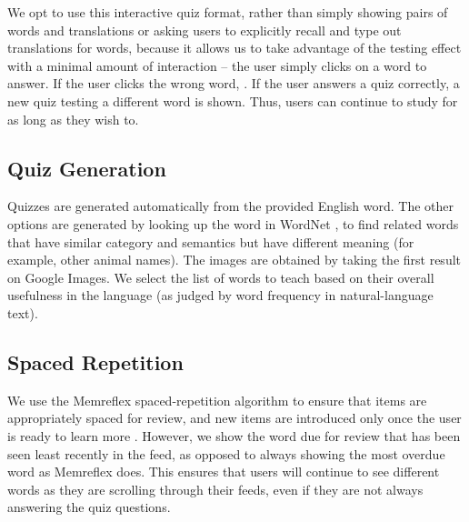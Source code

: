\documentclass{chi-ext}
\begin{document}

We opt to use this interactive quiz format, rather than simply showing pairs of words and translations or asking users to explicitly recall and type out translations for words, because it allows us to take advantage of the testing effect with a minimal amount of interaction -- the user simply clicks on a word to answer. If the user clicks the wrong word, . If the user answers a quiz correctly, a new quiz testing a different word is shown. Thus, users can continue to study for as long as they wish to.

\subsection{Quiz Generation}

Quizzes are generated automatically from the provided English word. The other options are generated by looking up the word in WordNet \cite{wordnet}, to find related words that have similar category and semantics but have different meaning (for example, other animal names). The images are obtained by taking the first result on Google Images. We select the list of words to teach based on their overall usefulness in the language (as judged by word frequency in natural-language text).

\subsection{Spaced Repetition}

We use the Memreflex spaced-repetition algorithm to ensure that items are appropriately spaced for review, and new items are introduced only once the user is ready to learn more \cite{memreflex}. However, we show the word due for review that has been seen least recently in the feed, as opposed to always showing the most overdue word as Memreflex does. This ensures that users will continue to see different words as they are scrolling through their feeds, even if they are not always answering the quiz questions.
\end{document}
